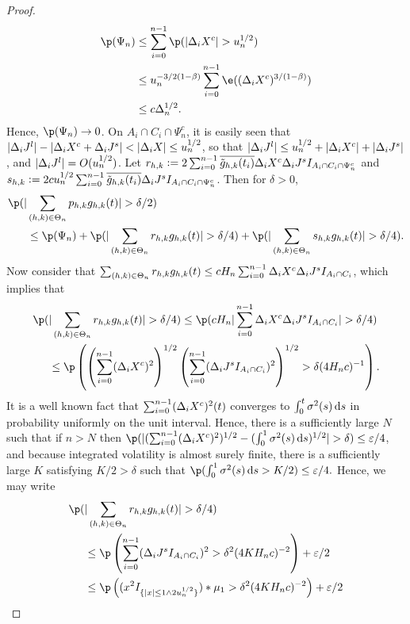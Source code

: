 \begin{proof}
\begin{align}
  \p(\Psi_n ) &\le \sumin \p(\vert \dxc \vert > u_n^{1/2}) \notag \\
  & \le u_n^{-3/2(1 - \beta) } \sumin \e( (\dxc)^{ 3/(1 - \beta)} ) \notag\\
  & \le  c \Delta_n^{1/2}.
  \label{}
\end{align}
Hence, $\p(\Psi_n ) \to 0$. On $A_i \cap C_i \cap \Psi_n^c$, it is easily seen that $\vert \Delta_i J^l \vert - \vert \Delta_i X^c + \Delta_i J^s \vert < \vert \Delta_i X \vert \le u_n^{1/2}$, so that $\vert \Delta_i J^l\vert \le u^{1/2}_n + \vert \Delta_i X^c \vert + \vert \Delta_i J^s\vert$, and  $ \vert \Delta_i J^l \vert  = O(u^{1/2}_n)$. Let $r_{h,k} :=  2 \sum_{i = 0}^{n-1} \overline{\tilde{g}_{h,k}(t_i)}\Delta_i X^c \Delta_i J^s I_{A_i \cap C_i \cap \Psi_n^c}$ and $s_{h,k} := 2 c u_n^{1/2}\sum_{i = 0}^{n-1} \overline{\tilde{g}_{h,k}(t_i)} \Delta_i J^s I_{A_i \cap C_i \cap \Psi_n^c}$. Then for $\delta > 0$, 
\begin{align}
 \p(\vert&\sumt p_{h,k} \ghk(t) \vert > \delta/2)\notag \\&  \le \p(\Psi_n) + \p(\vert\sumt r_{h,k} \ghk(t) \vert > \delta/4) + \p(\vert\sumt s_{h,k} \ghk(t) \vert > \delta/4).\notag
  \label{}
\end{align}
Now consider that $\sum_{(h,k) \in \Theta_n} r_{h,k} g_{h,k}(t) \le  c H_n \sum_{i = 0}^{n-1} \Delta_i X^c \Delta_i J^s I_{A_i \cap C_i}$, which implies that  
\begin{align}
  \p(&\vert\sumt r_{h,k} \ghk(t) \vert > \delta/4) \le \p(c H_n \vert \sumin \dxc \djt I_{A_i \cap C_i} \vert  > \delta/4)\notag\\& \le \p\left( \left(\sumin (\dxc)^2\right)^{1/2} \left(\sumin ( \djt I_{A_i \cap C_i})^2\right)^{1/2} > \delta (4H_nc)^{-1}\right).\notag
  \label{}
\end{align}
It is a well known fact that  $\sum_{i = 0}^{n-1} (\Delta_i X^c)^2 (t)$ converges to $\int_0^t\sigma^2(s)\D s$ in probability uniformly on the unit interval. Hence, there is a sufficiently large $N$ such that if $n > N$ then $ \p(\vert (\sumin (\dxc)^2)^{1/2}  - (\int_0^1\sigma^2(s) \D s)^{1/2}\vert > \delta ) \le  \varepsilon/4$, and because integrated volatility is almost surely finite, there is a sufficiently large $K$ satisfying  $K/2 > \delta$ such that $\p( \int_0^1\sigma^2(s) \D s > K/2) \le \varepsilon/4.$ Hence, we may write
\begin{align}
\p(&\vert\sumt r_{h,k} \ghk(t) \vert > \delta/4) \notag \\&\le \p\left(\sumin ( \djt I_{A_i \cap C_i})^2 > \delta^2 (4K H_nc)^{-2}\right) + \varepsilon/2\notag\\&\le  \p\left( (x^2I_{\{\vert x\vert \le 1 \wedge 2 u_n^{1/2}\}})\ast\mu_1 > \delta^2 (4K H_nc)^{-2}\right) + \varepsilon/2\notag\\

\end{align}
\end{proof}
